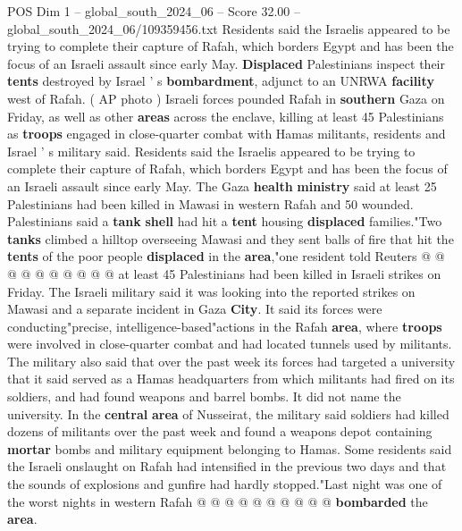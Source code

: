 \begin{textsample}{POS Dim 1 – global\_south\_2024\_06 – Score 32.00 – global\_south\_2024\_06/109359456.txt}  \label{ex:f1_pos_046}
Residents said the Israelis appeared to be trying to complete their capture of Rafah, which borders Egypt and has been the focus of an Israeli assault since early May. \textbf{Displaced} Palestinians inspect their \textbf{tents} destroyed by Israel ' s \textbf{bombardment}, adjunct to an UNRWA \textbf{facility} west of Rafah. ( AP photo ) Israeli forces pounded Rafah in \textbf{southern} Gaza on Friday, as well as other \textbf{areas} across the enclave, killing at least 45 Palestinians as \textbf{troops} engaged in close-quarter combat with Hamas militants, residents and Israel ' s military said.
Residents said the Israelis appeared to be trying to complete their capture of Rafah, which borders Egypt and has been the focus of an Israeli assault since early May.
The Gaza \textbf{health} \textbf{ministry} said at least 25 Palestinians had been killed in Mawasi in western Rafah and 50 wounded.
Palestinians said a \textbf{tank} \textbf{shell} had hit a \textbf{tent} housing \textbf{displaced} families."Two \textbf{tanks} climbed a hilltop overseeing Mawasi and they sent balls of fire that hit the \textbf{tents} of the poor people \textbf{displaced} in the \textbf{area},"one resident told Reuters @ @ @ @ @ @ @ @ @ @ at least 45 Palestinians had been killed in Israeli strikes on Friday.
The Israeli military said it was looking into the reported strikes on Mawasi and a separate incident in Gaza \textbf{City}.
It said its forces were conducting"precise, intelligence-based"actions in the Rafah \textbf{area}, where \textbf{troops} were involved in close-quarter combat and had located tunnels used by militants.
The military also said that over the past week its forces had targeted a university that it said served as a Hamas headquarters from which militants had fired on its soldiers, and had found weapons and barrel bombs.
It did not name the university.
In the \textbf{central} \textbf{area} of Nusseirat, the military said soldiers had killed dozens of militants over the past week and found a weapons depot containing \textbf{mortar} bombs and military equipment belonging to Hamas.
Some residents said the Israeli onslaught on Rafah had intensified in the previous two days and that the sounds of explosions and gunfire had hardly stopped."Last night was one of the worst nights in western Rafah @ @ @ @ @ @ @ @ @ @ \textbf{bombarded} the \textbf{area}.

\end{textsample}
